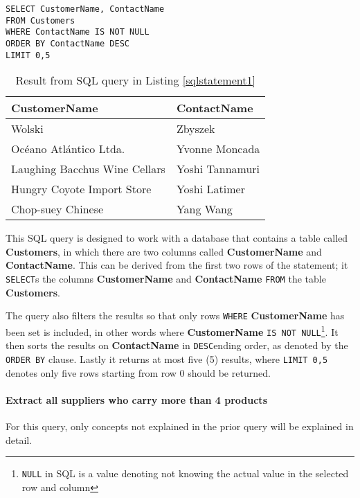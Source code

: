 \begin{lstlisting}[caption={Query for retrieving the name of five customers and their contact person},label={sqlstatement1}]
SELECT CustomerName, ContactName
FROM Customers
WHERE ContactName IS NOT NULL
ORDER BY ContactName DESC
LIMIT 0,5
\end{lstlisting}

\begin{table}[h]
  \centering
  \begin{tabular}{ | l | l | }
    \hline
    \textbf{CustomerName} & \textbf{ContactName} \\
    \hline
    Wolski & Zbyszek  \\
    \hline
    Océano Atlántico Ltda. & Yvonne Moncada \\
    \hline
    Laughing Bacchus Wine Cellars & Yoshi Tannamuri \\
    \hline
    Hungry Coyote Import Store & Yoshi Latimer \\
    \hline
    Chop-suey Chinese & Yang Wang \\
    \hline
  \end{tabular}
  \caption{Result from SQL query in Listing \ref{sqlstatement1}}
  \label{table:sql1}
\end{table}


This SQL query is designed to work with a database that contains a table
called \textbf{Customers}, in which there are two columns called
\textbf{CustomerName} and \textbf{ContactName}. This can be derived
from the first two rows of the statement; it \texttt{SELECT}s the
columns \textbf{CustomerName} and \textbf{ContactName} \texttt{FROM}
the table \textbf{Customers}.

The query also filters the results so that only rows \texttt{WHERE}
\textbf{CustomerName} has been set is included, in other words where
\textbf{CustomerName} \texttt{IS NOT NULL}\footnote{\texttt{NULL} in SQL is a
  value denoting not knowing the actual value in the selected row and column}.
It then sorts the results on \textbf{ContactName} in \texttt{DESC}ending order,
as denoted by the \texttt{ORDER BY} clause. Lastly it returns at most five (5)
results, where \texttt{LIMIT 0,5} denotes only five rows starting from row 0
should be returned.


\paragraph{Extract all suppliers who carry more than 4 products}
For this query, only concepts not explained in the prior query will be
explained in detail.

